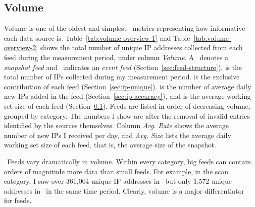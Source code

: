 \subsection{Volume}
\label{sec:ip-volume}

Volume is one of the oldest and simplest \ti\ metrics representing how informative
each data source is. Table~\ref{tab:volume-overview-1} and Table~\ref{tab:volume-overview-2} shows the total number of unique IP addresses
collected from each feed during the measurement period, under column \emph{Volume}. A \snapfeedsym\ denotes a \textit{snapshot feed}
and \deltafeedsym\ indicates an \textit{event feed} (Section~\ref{sec:feed-structure}).
 is the total number of IPs collected during my measurement period.
 is the exclusive contribution of each feed (Section~\ref{sec:ip-unique}).
 is the number of average daily new IPs added in the feed (Section~\ref{sec:ip-accuracy}), and
 is the average working set size of each feed (Section~\ref{sec:ip-volume}).
Feeds are listed in order of decreasing volume, grouped by category.
The numbers I show are after the removal of invalid entries identified
by the sources themselves. Column \emph{Avg. Rate} shows the average number of
new IPs I received per day, and \emph{Avg. Size} lists the average daily
working set size of each feed, that is, the average size of the snapshot.

\finding\ Feeds vary dramatically in volume. Within every category, big feeds can contain
orders of magnitude more data than small feeds. For example, in the scan category, I saw
over 361,004 unique IP addresses in \feeddshield\ but only 1,572 unique addresses
in \feedTSAnalyst\ in the same time period. Clearly, volume is a major differentiator
for feeds.




